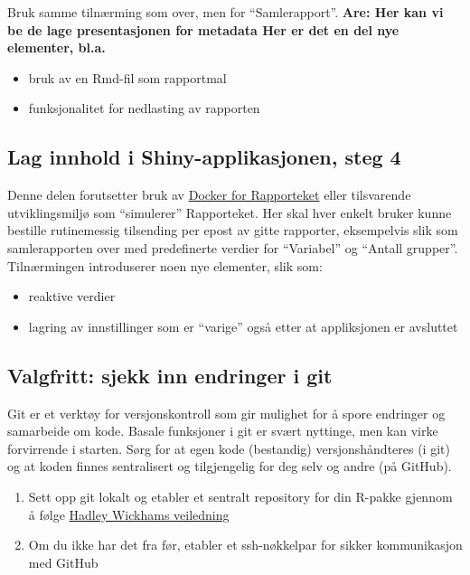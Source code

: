 \documentclass[]{article}
\providecommand{\tightlist}{%
  \setlength{\itemsep}{0pt}\setlength{\parskip}{0pt}}
\def\labelenumi{\arabic{enumi}.}
\begin{document}
Bruk samme tilnærming som over, men for ``Samlerapport''.
\bf{Are: Her kan vi be de lage presentasjonen for metadata}
Her er det en del nye elementer, bl.a.

\begin{itemize}
\tightlist
\item
  bruk av en Rmd-fil som rapportmal
\item
  funksjonalitet for nedlasting av rapporten
\end{itemize}

\subsection{Lag innhold i Shiny-applikasjonen, steg
4}\label{lag-innhold-i-shiny-applikasjonen-steg-4}

Denne delen forutsetter bruk av
\href{https://github.com/Rapporteket/docker}{Docker for Rapporteket}
eller tilsvarende utviklingsmiljø som ``simulerer'' Rapporteket. Her
skal hver enkelt bruker kunne bestille rutinemessig tilsending per epost
av gitte rapporter, eksempelvis slik som samlerapporten over med
predefinerte verdier for ``Variabel'' og ``Antall grupper''.
Tilnærmingen introduserer noen nye elementer, slik som:

\begin{itemize}
\tightlist
\item
  reaktive verdier
\item
  lagring av innstillinger som er ``varige'' også etter at appliksjonen
  er avsluttet
\end{itemize}

\subsection{Valgfritt: sjekk inn endringer i
git}\label{valgfritt-sjekk-inn-endringer-i-git}

Git er et verktøy for versjonskontroll som gir mulighet for å spore
endringer og samarbeide om kode. Basale funksjoner i git er svært
nyttinge, men kan virke forvirrende i starten. Sørg for at egen kode
(bestandig) versjonshåndteres (i git) og at koden finnes sentralisert og
tilgjengelig for deg selv og andre (på GitHub).

\begin{enumerate}
\def\labelenumi{\arabic{enumi}.}
\tightlist
\item
  Sett opp git lokalt og etabler et sentralt repository for din R-pakke
  gjennom å følge
  \href{http://r-pkgs.had.co.nz/git.html\#git-rstudio}{Hadley Wickhams
  veiledning}
\item
  Om du ikke har det fra før, etabler et ssh-nøkkelpar for sikker
  kommunikasjon med GitHub
\end{enumerate}
\end{document}
